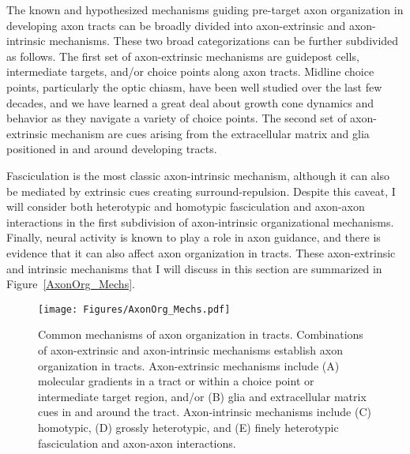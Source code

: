 \label{sec:MoleculesMechanisms}
The known and hypothesized mechanisms guiding pre-target axon organization in developing axon tracts can be broadly divided into axon-extrinsic and axon-intrinsic mechanisms.
These two broad categorizations can be further subdivided as follows.
The first set of axon-extrinsic mechanisms are guidepost cells, intermediate targets, and/or choice points along axon tracts.
Midline choice points, particularly the optic chiasm, have been well studied over the last few decades, and we have learned a great deal about growth cone dynamics and behavior as they navigate a variety of choice points.
The second set of axon-extrinsic mechanism are cues arising from the extracellular matrix and glia positioned in and around developing tracts.

Fasciculation is the most classic axon-intrinsic mechanism, although it can also be mediated by extrinsic cues creating surround-repulsion.
Despite this caveat, I will consider both heterotypic and homotypic fasciculation and axon-axon interactions in the first subdivision of axon-intrinsic organizational mechanisms.
Finally, neural activity is known to play a role in axon guidance, and there is evidence that it can also affect axon organization in tracts.
These axon-extrinsic and intrinsic mechanisms that I will discuss in this section are summarized in Figure~\ref{AxonOrg_Mechs}.
\begin{figure}[hbtp]
    \begin{center}
    \texttt{[image: Figures/AxonOrg\_Mechs.pdf]}
    \caption[Common mechanisms of axon organization in tracts.]
    {Common mechanisms of axon organization in tracts.
    Combinations of axon-extrinsic and axon-intrinsic mechanisms establish axon organization in tracts.
    Axon-extrinsic mechanisms include (A) molecular gradients in a tract or within a choice point or intermediate target region, and/or (B) glia and extracellular matrix cues in and around the tract.
    Axon-intrinsic mechanisms include (C) homotypic, (D) grossly heterotypic, and (E) finely heterotypic fasciculation and axon-axon interactions.}
    \label{AxonOrgMechs}
    \end{center}
\end{figure}
